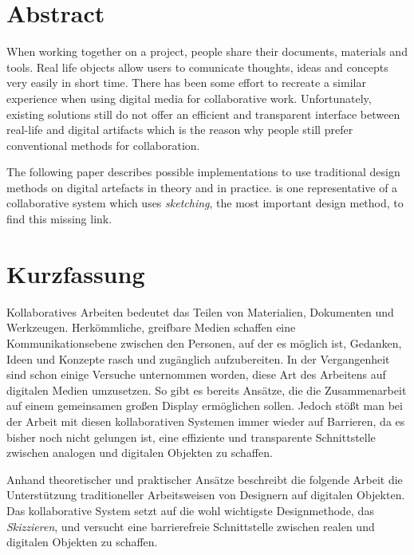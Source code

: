 \begingroup
\let\clearpage\relax
\let\cleardoublepage\relax
\let\cleardoublepage\relax

\chapter*{Abstract}
When working together on a project, people share their documents, materials and tools. Real life objects allow users to comunicate thoughts, ideas and concepts very easily in short time. There has been some effort to recreate a similar experience when using digital media for collaborative work. Unfortunately, existing solutions still do not offer an efficient and transparent interface between real-life and digital artifacts which is the reason why people still prefer conventional methods for collaboration. 

The following paper describes possible implementations to use traditional design methods on digital artefacts in theory and in practice. \scribbler is one representative of a collaborative system which uses \emph{sketching}, the most important design method, to find this missing link.

\vfill

\chapter*{Kurzfassung}
Kollaboratives Arbeiten bedeutet das Teilen von Materialien, Dokumenten und Werkzeugen. Herkömmliche, greifbare Medien schaffen eine Kommunikationsebene zwischen den Personen, auf der es möglich ist, Gedanken, Ideen und Konzepte rasch und zugänglich aufzubereiten. In der Vergangenheit sind schon einige Versuche unternommen worden, diese Art des Arbeitens auf digitalen Medien umzusetzen. So gibt es bereits Ansätze, die die Zusammenarbeit auf einem gemeinsamen großen Display ermöglichen sollen. Jedoch stößt man bei der Arbeit mit diesen kollaborativen Systemen immer wieder auf Barrieren, da es bisher noch nicht gelungen ist, eine effiziente und transparente Schnittstelle zwischen analogen und digitalen Objekten zu schaffen.

Anhand theoretischer und praktischer Ansätze beschreibt die folgende Arbeit die Unterstützung traditioneller Arbeitsweisen von Designern auf digitalen Objekten. Das kollaborative System \scribbler setzt auf die wohl wichtigste Designmethode, das \emph{Skizzieren}, und versucht eine barrierefreie Schnittstelle zwischen realen und digitalen Objekten zu schaffen.

\endgroup			

\vfill